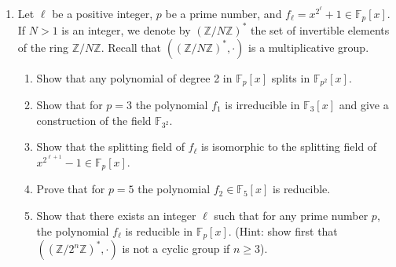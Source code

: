 \documentclass{article}
\begin{document}
\begin{enumerate}
    \item Let $\ell$ be a positive integer, $p$ be a prime number, and $f_{\ell} = x^{2^\ell} + 1 \in \mathbb{F}_{p}[x]$. If $N > 1$ is an integer, we denote by $(\mathbb{Z} / N \mathbb{Z})^*$ the set of invertible elements of the ring $\mathbb{Z} / N \mathbb{Z}$. Recall that $((\mathbb{Z} / N \mathbb{Z})^*, \cdot)$ is a multiplicative group.
    \begin{enumerate}
        \item Show that any polynomial of degree 2 in $\mathbb{F}_{p}[x]$ splits in $\mathbb{F}_{p^2}[x]$.
        \item Show that for $p = 3$ the polynomial $f_{1}$ is irreducible in $\mathbb{F}_{3}[x]$ and give a construction of the field $\mathbb{F}_{3^2}$.
        \item Show that the splitting field of $f_{\ell}$ is isomorphic to the splitting field of $x^{2^{\ell+1}} - 1 \in \mathbb{F}_{p}[x]$.
        \item Prove that for $p = 5$ the polynomial $f_{2} \in \mathbb{F}_{5}[x]$ is reducible.
        \item Show that there exists an integer $\ell$ such that for any prime number $p$, the polynomial $f_{\ell}$ is reducible in $\mathbb{F}_{p}[x]$. (Hint: show first that $((\mathbb{Z} / 2^n \mathbb{Z})^*, \cdot)$ is not a cyclic group if $n \geq 3$).
    \end{enumerate}
\end{enumerate}
\end{document}
